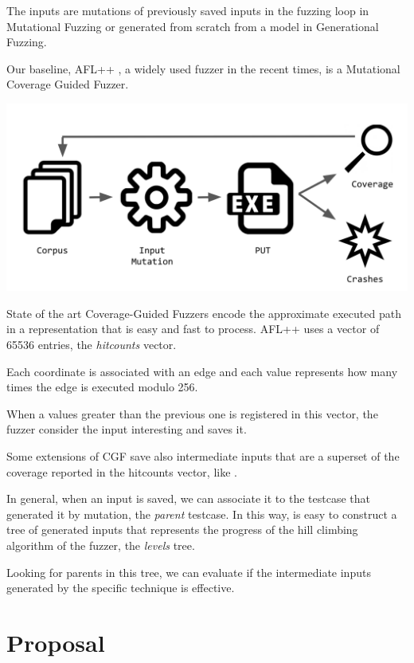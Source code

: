 \documentclass[conference,compsoc]{IEEEtran}
\begin{document}
The inputs are mutations of previously saved inputs in the fuzzing loop in Mutational Fuzzing or generated from scratch from a model in Generational Fuzzing.

Our baseline, {\sc AFL++} \cite{aflplusplus}, a widely used fuzzer in the recent times, is a Mutational Coverage Guided Fuzzer.

\begin{center}
\includegraphics[scale=0.2]{cgf}
\end{center}

State of the art Coverage-Guided Fuzzers encode the approximate executed path in a representation that is easy and fast to process.
{\sc AFL++} uses a vector of 65536 entries, the {\it hitcounts} vector.

Each coordinate is associated with an edge and each value represents how many times the edge is executed modulo 256.

When a values greater than the previous one is registered in this vector, the fuzzer consider the input interesting and saves it.

Some extensions of CGF save also intermediate inputs that are a superset of the coverage reported in the hitcounts vector, like \cite{lafintel} \cite{ijon} \cite{besensitive}.

In general, when an input is saved, we can associate it to the testcase that generated it by mutation, the {\it parent} testcase. In this way, is easy to construct a tree of generated inputs that represents the progress of the hill climbing algorithm of the fuzzer, the {\it levels} tree.

Looking for parents in this tree, we can evaluate if the intermediate inputs generated by the specific technique is effective.

\section{Proposal}
\end{document}
